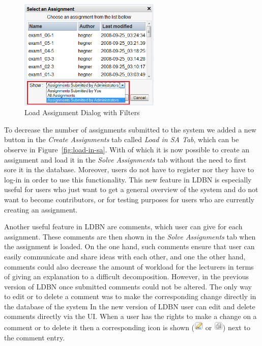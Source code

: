 \begin{figure}[h]
	\begin{center}
		\includegraphics[width=0.6\textwidth]{./img/load-assg.png}
		\caption{Load Assignment Dialog with Filters}
		\label{fig:load-assg}
	\end{center}
\end{figure}


To decrease the number of assignments submitted to the system we added a new button
in the \emph{Create Assignments} tab called \emph{Load in SA Tab}, 
which can be observe in Figure~\ref{fig:load-in-sa}.
With of which it is now possible to create an assignment and load it 
in the \emph{Solve Assignments} tab without
the need to first sore it in the database. Moreover, users do not have to register nor 
they have to log-in in order to use this
functionality. This new feature in LDBN is especially useful for users who 
just want to get a general overview of the system and
do not want to become contributors, 
or for testing purposes for users who are currently creating an assignment. 

Another useful feature in LDBN are comments, which user can give for each assignment. These comments
are then shown in the \emph{Solve Assignments} tab when the assignment is loaded. On the one
hand, such comments ensure that user can easily communicate and share ideas with each
other, and one the other hand, comments could also decrease the amount of workload
for the lecturers in terms of giving an explanation to a difficult decomposition. However, in the 
previous version of LDBN once submitted comments could not be altered. The only way to edit or to delete a
comment was to make the corresponding change directly in the database of the system 
In the new version of LDBN user can edit and delete comments directly  via the UI. When a user has
the rights to make a change on a comment or to delete it then a corresponding icon is shown 
(\includegraphics[scale=0.7]{./img/edit.png} or \includegraphics[scale=0.7]{./img/del.png})
next to the comment entry.


